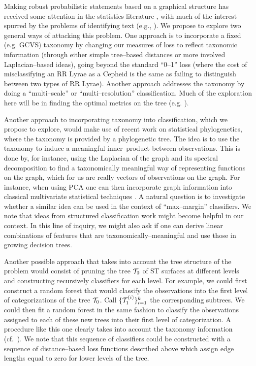 Making robust probabilistic statements based on a graphical structure has
received some attention in the statistics literature
\citep{DBLP:conf/icml/KollerS97,DBLP:conf/icdm/SunL01,DBLP:conf/icml/DekelKS04,
CesaBianchi06,  bcmt-lmmsc-04}, with much of the interest spurred by the
problems of identifying text (e.g., \citealt{593971}). We propose to explore two
general ways of attacking this problem. One approach is to incorporate a fixed
(e.g. GCVS) taxonomy by changing our measures of loss to reflect taxonomic
information (through either simple tree--based distances or more involved
Laplacian--based ideas), going beyond the standard ``0--1'' loss (where the cost
of misclassifying an RR Lyrae as a Cepheid is the same as failing to distinguish
between two types of RR Lyrae).  Another approach addresses the taxonomy by
doing a ``multi--scale'' or ``multi--resolution'' classification.  Much of the
exploration here will be in finding the optimal metrics on the tree (e.g.
\citealt{ChungSpectralGraphTheoryBook97}).

Another approach to incorporating taxonomy into classification, which we propose
to explore, would make use of recent work on statistical phylogenetics, where
the taxonomy is provided by a phylogenetic tree\citep{elithesis}.  The idea is
to use the taxonomy to induce a meaningful inner--product between observations.
This is done by, for instance, using the Laplacian of the graph and its spectral
decomposition to find a taxonomically meaningful way of representing functions
on the graph, which for us are really vectors of observations on the graph. For
instance, when using PCA one can then incorporate graph information into
classical multivariate statistical techniques
\citep{PurdomAnalyzingDataWithGraphs08}.  A natural question is to investigate
whether a similar idea can be used in the context of ``max--margin''
classifiers. We note that ideas from structured classification work
\citep{bcmt-lmmsc-04} might become helpful in our context. In this line of
inquiry, we might also ask if one can derive linear combinations of features
that are taxonomically--meaningful and use those in growing decision trees.

Another possible approach that takes into account the tree structure of the
problem would consist of pruning the tree ${\cal T}_0$ of ST surfaces at
different levels and constructing recursively classifiers for each level.  For
example, we could first construct a random forest that would classify the
observations into the first level of categorizations of the tree ${\cal T}_0$.
Call $\{{\cal T}_1^{(i)}\}_{i=1}^k$ the corresponding subtrees. We could then
fit a random forest in the same fashion to classify the observations assigned to
each of these new trees into their first level of categorization. A procedure
like this one clearly takes into account the taxonomy information (cf.\
\citealt{CesaBianchi06}).  We note that this sequence of classifiers could be
constructed with a sequence of distance--based loss functions described above
which assign edge lengths equal to zero for lower levels of the tree.

